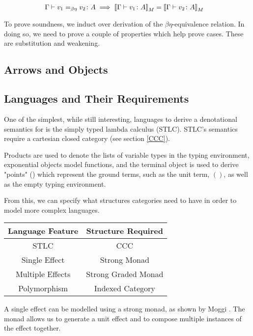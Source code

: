 \documentclass{Report}
\begin{document}
\begin{align}
    \Gamma \vdash v_1 =_{\beta\eta} v_2 \colon A & \implies {\bf [\![}\Gamma \vdash v_1 \colon A{\bf ]\!]}_M = {\bf [\![}\Gamma \vdash v_2 \colon A{\bf ]\!]}_M
\end{align}

To prove soundness, we induct over derivation of the $\beta\eta$-equivalence relation. In doing so, we need to prove a couple of properties which help prove cases. These are substitution and weakening. 


\subsection{Arrows and Objects}
\subsection{Languages and Their Requirements}
One of the simplest, while still interesting, languages to derive a denotational semantics for is the simply typed lambda calculus (STLC). STLC's semantics require a cartesian closed category (see section \ref{CCC}).

Products are used to denote the lists of variable types in the typing environment, exponential objects model functions, and the terminal object is used to derive "points" () which represent the ground terms, such as the unit term, $()$, as well as the empty typing environment.

From this, we can specify what structures categories need to have in order to model more complex languages.
\begin{center}
    \begin{tabular}{|c|c|}
        \hline
        Language Feature & Structure Required \\
        \hline
        \hline
        STLC            & CCC \\
        \hline
        Single Effect   & Strong Monad \\
        \hline
        Multiple Effects & Strong Graded Monad \\
        \hline
        Polymorphism & Indexed Category \\
        \hline
    \end{tabular}
\end{center}


A single effect can be modelled using a strong monad, as shown by Moggi . The monad allows us to generate a unit effect and to compose multiple instances of the effect together.
\end{document}
